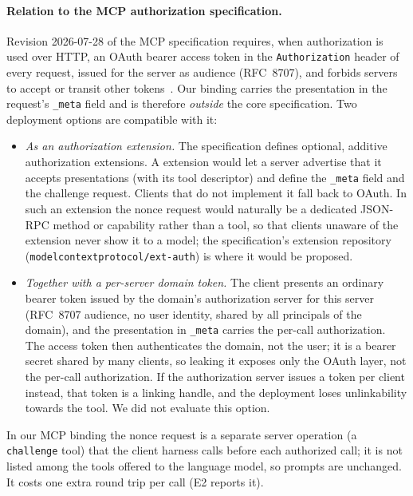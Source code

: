 \paragraph{Relation to the MCP authorization specification.} Revision 2026-07-28 of the MCP specification requires, when authorization is used over HTTP, an OAuth bearer access token in the \texttt{Authorization} header of every request, issued for the server as audience (RFC~8707), and forbids servers to accept or transit other tokens~\cite{mcpauth}. Our binding carries the presentation in the request's \texttt{\_meta} field and is therefore \emph{outside} the core specification. Two deployment options are compatible with it:
\begin{itemize}[leftmargin=*]
\item \emph{As an authorization extension.} The specification defines optional, additive authorization extensions. A \sys{} extension would let a server advertise that it accepts presentations (with its tool descriptor) and define the \texttt{\_meta} field and the challenge request. Clients that do not implement it fall back to OAuth. In such an extension the nonce request would naturally be a dedicated JSON-RPC method or capability rather than a tool, so that clients unaware of the extension never show it to a model; the specification's extension repository (\texttt{modelcontextprotocol/ext-auth}) is where it would be proposed.
\item \emph{Together with a per-server domain token.} The client presents an ordinary bearer token issued by the domain's authorization server for this server (RFC~8707 audience, no user identity, shared by all principals of the domain), and the presentation in \texttt{\_meta} carries the per-call authorization. The access token then authenticates the domain, not the user; it is a bearer secret shared by many clients, so leaking it exposes only the OAuth layer, not the per-call authorization. If the authorization server issues a token per client instead, that token is a linking handle, and the deployment loses unlinkability towards the tool. We did not evaluate this option.
\end{itemize}
In our MCP binding the nonce request is a separate server operation (a \texttt{challenge} tool) that the client harness calls before each authorized call; it is not listed among the tools offered to the language model, so prompts are unchanged. It costs one extra round trip per call (E2 reports it).

